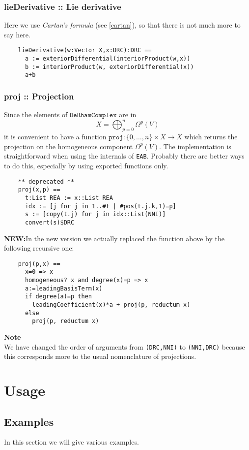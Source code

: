 \documentclass[12pt,a4paper]{article}
\begin{document}
\subsubsection{lieDerivative :: Lie derivative}
Here we use {\it Cartan's formula} (see \ref{cartan}), so that there is 
not much more to say here.
\begin{lstlisting}
    lieDerivative(w:Vector X,x:DRC):DRC ==
      a := exteriorDifferential(interiorProduct(w,x))
      b := interiorProduct(w, exteriorDifferential(x))
      a+b
\end{lstlisting}
%
\subsubsection{proj :: Projection}
Since the elements of $\mathtt{DeRhamComplex}$ are in
\begin{displaymath}
  X = \bigoplus_{p = 0}^n \Omega^p (V) 
\end{displaymath}
it is convenient to have a function 
$\mathtt{proj}:\{ 0, \ldots,n \}\times X \rightarrow X$ which 
returns the projection on the homogeneous component
$\Omega^p (V)$. The implementation is straightforward when using the
internals of {\tt EAB}. Probably there are better ways to do this,
especially by using exported functions only.
\begin{lstlisting}
    ** deprecated **
    proj(x,p) ==
      t:List REA := x::List REA
      idx := [j for j in 1..#t | #pos(t.j.k,1)=p]
      s := [copy(t.j) for j in idx::List(NNI)]
      convert(s)$DRC
\end{lstlisting}
{\bf NEW:}In the new version we actually replaced the function above by 
the following recursive one:
\begin{lstlisting}
    proj(p,x) ==
      x=0 => x
      homogeneous? x and degree(x)=p => x
      a:=leadingBasisTerm(x)
      if degree(a)=p then
        leadingCoefficient(x)*a + proj(p, reductum x)
      else
        proj(p, reductum x)
\end{lstlisting}
{\bf Note} \\
We have changed the order of arguments from 
{\tt (DRC,NNI)} to {\tt (NNI,DRC)} because this corresponds more to the 
usual nomenclature of projections.
%
\section{Usage}
\subsection{Examples}
In this section we will give various examples.
\end{document}
